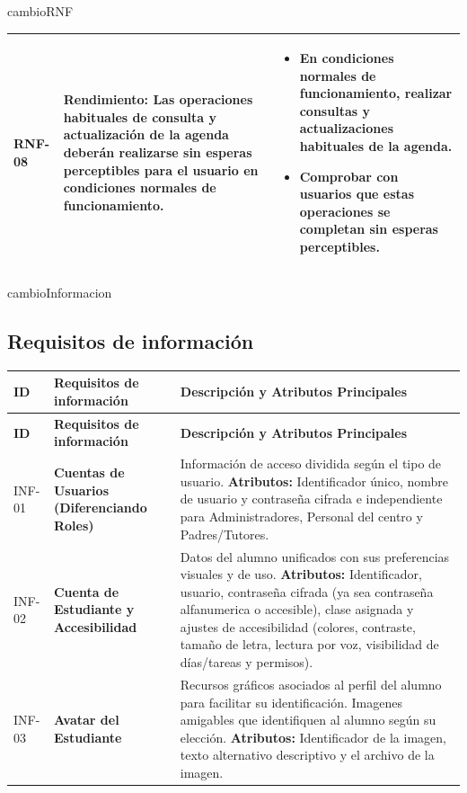 \begin{cambiocontenido}{cambioRNF}
\begin{longtable}{|>{\raggedright\arraybackslash}p{1.4cm}|>{\raggedright\arraybackslash}p{5.5cm}|>{\raggedright\arraybackslash}p{7.8cm}|}
\hline
\hypertarget{rnf-08}{}RNF-08 & \textbf{Rendimiento:} Las operaciones habituales de consulta y actualización de la agenda deberán realizarse sin esperas perceptibles para el usuario en condiciones normales de funcionamiento. & \begin{itemize}[nosep,leftmargin=*]\item En condiciones normales de funcionamiento, realizar consultas y actualizaciones habituales de la agenda. \item Comprobar con usuarios que estas operaciones se completan sin esperas perceptibles.\end{itemize} \\
\hline
\end{longtable}
\endgroup


\end{cambiocontenido}
\begin{cambiocontenido}{cambioInformacion}
\subsection{Requisitos de información}
\begingroup
\small
\begin{longtable}{|>{\raggedright\arraybackslash}p{1.5cm}|>{\raggedright\arraybackslash}p{4.0cm}|>{\raggedright\arraybackslash}p{9.0cm}|}
\hline
\rowcolor{tableHeader}
\textbf{ID} & \textbf{Requisitos de información} & \textbf{Descripción y Atributos Principales} \\
\hline
\endfirsthead
\rowcolor{tableHeader}
\textbf{ID} & \textbf{Requisitos de información} & \textbf{Descripción y Atributos Principales} \\
\hline
\endhead

INF-01 & \textbf{Cuentas de Usuarios (Diferenciando Roles)} & Información de acceso dividida según el tipo de usuario. \textbf{Atributos:} Identificador único, nombre de usuario y contraseña cifrada e independiente para Administradores, Personal del centro y Padres/Tutores. \\
\hline

INF-02 & \textbf{Cuenta de Estudiante y Accesibilidad} & Datos del alumno unificados con sus preferencias visuales y de uso. \textbf{Atributos:} Identificador, usuario, contraseña cifrada (ya sea contraseña alfanumerica o accesible), clase asignada y ajustes de accesibilidad (colores, contraste, tamaño de letra, lectura por voz, visibilidad de días/tareas y permisos). \\
\hline

INF-03 & \textbf{Avatar del Estudiante} & Recursos gráficos asociados al perfil del alumno para facilitar su identificación. Imagenes amigables que identifiquen al alumno según su elección. \textbf{Atributos:} Identificador de la imagen, texto alternativo descriptivo y el archivo de la imagen. \\
\hline


\end{longtable}
\end{cambiocontenido}
